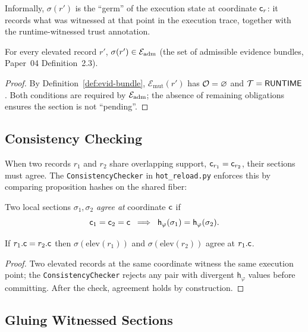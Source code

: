 \documentclass[11pt]{article}
\newcommand{\elevate}{\mathrm{elev}}             %
\newcommand{\MutEvid}{{\mathcal{E}_{\mathrm{mut}}}}%
\newcommand{\LocSec}{\sigma}                     %
\newcommand{\PropHash}{\mathsf{h}_\varphi}       %
\begin{document}
Informally, $\LocSec(r')$ is the ``germ'' of the execution state at
coordinate $\mathsf{c}_r$: it records what was witnessed at that point in
the execution trace, together with the runtime-witnessed trust
annotation.

\begin{proposition}
\label{prop:adm}
For every elevated record $r'$, $\LocSec(r') \in \Eadm$
(the set of admissible evidence bundles, Paper~04 Definition~2.3).
\end{proposition}
\begin{proof}
By Definition~\ref{def:evid-bundle}, $\MutEvid(r')$ has
$\mathcal{O} = \varnothing$ and $\mathcal{T} = \mathsf{RUNTIME}$.  Both conditions
are required by $\mathcal{E}_{\mathrm{adm}}$; the absence of remaining obligations
ensures the section is not ``pending''.
\end{proof}

\subsection{Consistency Checking}
\label{subsec:consistency}

When two records $r_1$ and $r_2$ share overlapping support,
\ie $\mathsf{c}_{r_1} = \mathsf{c}_{r_2}$, their sections must agree.  The
\texttt{ConsistencyChecker} in \texttt{hot\_reload.py} enforces this
by comparing proposition hashes on the shared fiber:

\begin{definition}
\label{def:agreement}
Two local sections $\LocSec_1, \LocSec_2$ \emph{agree at} coordinate
$\mathsf{c}$ if
\[
  \coord_1 = \coord_2 = \coord
  \;\implies\;
  \PropHash(\LocSec_1) = \PropHash(\LocSec_2).
\]
\end{definition}

\begin{proposition}
\label{prop:agree}
If $r_1.\mathsf{c} = r_2.\mathsf{c}$ then $\LocSec(\elevate(r_1))$ and
$\LocSec(\elevate(r_2))$ agree at $r_1.\mathsf{c}$.
\end{proposition}
\begin{proof}
Two elevated records at the same coordinate witness the same execution
point; the \texttt{ConsistencyChecker} rejects any pair with
divergent $\PropHash$ values before committing.  After the check,
agreement holds by construction.
\end{proof}

\subsection{Gluing Witnessed Sections}
\label{subsec:gluing}
\end{document}
